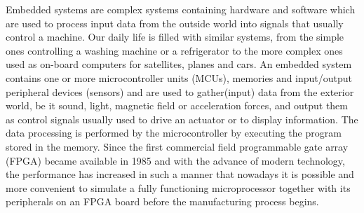 \hspace{0.5cm} Embedded systems are complex systems containing hardware and software which are used to
process input data from the outside world into signals that usually control a machine. Our
daily life is filled with similar systems, from the simple ones controlling a washing machine
or a refrigerator to the more complex ones used as on-board computers for satellites, planes
and cars.
An embedded system contains one or more microcontroller units (MCUs), memories and
input/output peripheral devices (sensors) and are used to gather(input) data from the exterior
world, be it sound, light, magnetic field or acceleration forces, and output them as control
signals usually used to drive an actuator or to display information. The data processing is
performed by the microcontroller by executing the program stored in the memory. Since the
first commercial field programmable gate array (FPGA) became available in 1985 and with
the advance of modern technology, the performance has increased in such a manner that
nowadays it is possible and more convenient to simulate a fully functioning microprocessor
together with its peripherals on an FPGA board before the manufacturing process begins.

